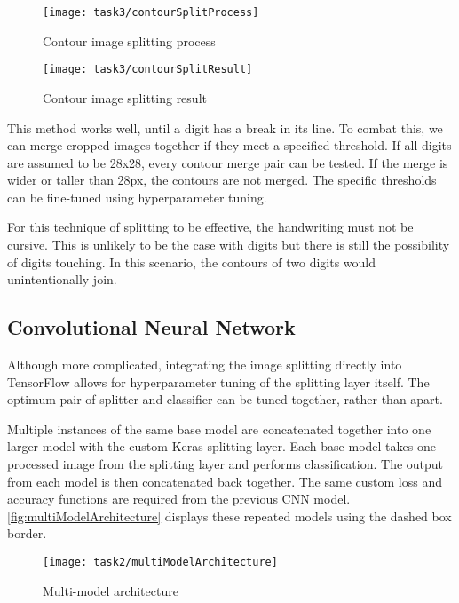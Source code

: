 \begin{figure}[!htbp]
    \centering
    \texttt{[image: task3/contourSplitProcess]}
    \caption[Contour image splitting process]
    {Contour image splitting process}
    \label{fig:contourSplitProcess}
\end{figure}

\begin{figure}[!htbp]
    \centering
    \texttt{[image: task3/contourSplitResult]}
    \caption[Contour image splitting result]
    {Contour image splitting result}
    \label{fig:contourSplitResult}
\end{figure}

This method works well, until a digit has a break in its line. To combat this, we can merge cropped images together if they meet a specified threshold. If all digits are assumed to be 28x28, every contour merge pair can be tested. If the merge is wider or taller than 28px, the contours are not merged. The specific thresholds can be fine-tuned using hyperparameter tuning.

For this technique of splitting to be effective, the handwriting must not be cursive. This is unlikely to be the case with digits but there is still the possibility of digits touching. In this scenario, the contours of two digits would unintentionally join.

\pagebreak
\subsection{Convolutional Neural Network}

Although more complicated, integrating the image splitting directly into TensorFlow allows for hyperparameter tuning of the splitting layer itself. The optimum pair of splitter and classifier can be tuned together, rather than apart.

Multiple instances of the same base model are concatenated together into one larger model with the custom Keras splitting layer. Each base model takes one processed image from the splitting layer and performs classification. The output from each model is then concatenated back together. The same custom loss and accuracy functions are required from the previous CNN model. \autoref{fig:multiModelArchitecture} displays these repeated models using the dashed box border.

\begin{figure}[!htbp]
    \centering
    \texttt{[image: task2/multiModelArchitecture]}
    \caption[Multi-model architecture]
    {Multi-model architecture}
    \label{fig:multiModelArchitecture}
\end{figure}

